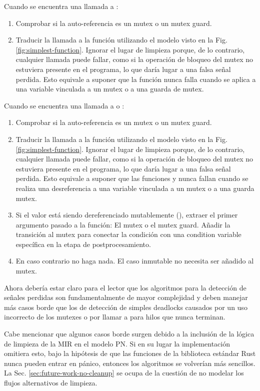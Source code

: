 Cuando se encuentra una llamada a :

\begin{enumerate}
      \item Comprobar si la auto-referencia  es un mutex o un mutex guard.
      \item Traducir la llamada a la función utilizando el modelo visto en la Fig. \ref{fig:simplest-function}.
            Ignorar el lugar de limpieza porque, de lo contrario, cualquier llamada puede fallar, como si la operación
            de bloqueo del mutex no estuviera presente en el programa, lo que daría lugar a una falsa
            señal perdida. Esto equivale a suponer que la función  nunca falla cuando se
            aplica a una variable vinculada a un mutex o a una guarda de mutex.
\end{enumerate}

Cuando se encuentra una llamada a 
o :

\begin{enumerate}
      \item Comprobar si la auto-referencia  es un mutex o un mutex guard.
      \item Traducir la llamada a la función utilizando el modelo visto en la Fig. \ref{fig:simplest-function}.
            Ignorar el lugar de limpieza porque, de lo contrario, cualquier llamada puede fallar, como si la operación
            de bloqueo del mutex no estuviera presente en el programa, lo que daría lugar a una falsa
            señal perdida. Esto equivale a suponer que las funciones  y  nunca fallan
            cuando se realiza una desreferencia a una variable vinculada a un mutex o a una guarda
            mutex.
      \item Si el valor está siendo dereferenciado mutablemente (),
            extraer el primer argumento pasado a la función: El mutex o el mutex guard.
            Añadir la transición  al mutex
            para conectar la condición con una condition variable específica en la etapa de postprocesamiento.
      \item En caso contrario no haga nada. El caso inmutable no necesita ser añadido al mutex.
\end{enumerate}

Ahora debería estar claro para el lector que los algoritmos para la detección de señales
perdidas son fundamentalmente de mayor complejidad y deben manejar más casos borde
que los de detección de simples deadlocks causados por un uso incorrecto de los mutexes o
por llamar a  para hilos que nunca terminan.

Cabe mencionar que algunos casos borde surgen debido a la inclusión de la lógica de limpieza
de la \acrshort{MIR} en el modelo \acrshort{PN}.
Si en su lugar la implementación omitiera esto, bajo la hipótesis de
que las funciones de la biblioteca estándar Rust nunca pueden entrar en pánico,
entonces los algoritmos se volverían más sencillos.
La Sec. \ref{sec:future-work-no-cleanup} se ocupa
de la cuestión de no modelar los flujos alternativos de limpieza.
